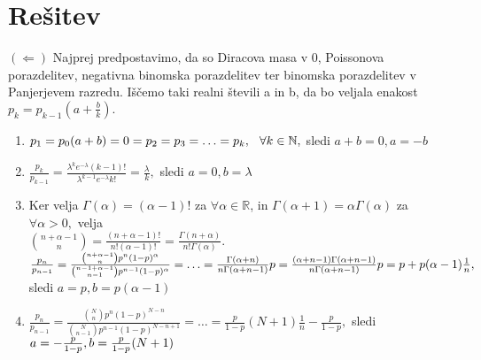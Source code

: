 \documentclass[a4paper]{article}
\begin{document}
\section{Rešitev}
$(\Leftarrow)$ Najprej predpostavimo, da so Diracova masa v 0, Poissonova porazdelitev, negativna binomska porazdelitev ter binomska porazdelitev v Panjerjevem razredu. Iščemo taki realni števili a in b, da bo veljala enakost $p_k = p_{k-1}(a + \frac{b}{k}).$
\begin{enumerate}
	\item{$p_1=p_0(a + b) = 0 = p_2 = p_3 = \ldots = p_k, \hspace{0.25cm} \forall k \in \mathbb{N},$ sledi $a + b = 0, a=-b$}
	\item{$\frac{p_k}{p_{k-1}}=\frac{\lambda^k e^{-\lambda}(k-1)!}{\lambda^{k-1} e^{-\lambda}k!} = \frac{\lambda}{k}, $ sledi $ a = 0, b = \lambda$} 
	\item{Ker velja $\Gamma(\alpha)=(\alpha-1)!$  za $\forall \alpha \in \mathbb{R}$, in $\Gamma(\alpha+1)=\alpha\Gamma(\alpha)$ za $\forall \alpha > 0,$ velja \\[1.5mm] ${n +\alpha - 1 \choose n} = \frac{(n+\alpha-1)!}{n!(\alpha-1)!}=\frac{\Gamma(n+\alpha)}{n!\Gamma(\alpha)}.$ \\[1.5mm] $\frac{p_n}{p_{n-1}}=\frac{\binom{n + \alpha - 1}{n}p^n(1-p)^{\alpha}}{\binom{n-1+\alpha-1}{n-1}p^{n-1}(1-p)^\alpha}=\ldots=\frac{\Gamma(\alpha+n)}{n\Gamma(\alpha+n-1)}p=\frac{(\alpha+n-1)\Gamma(\alpha+n-1)}{n\Gamma(\alpha+n-1)}p= \\[1.5mm] p+p(\alpha-1)\frac{1}{n}, $ sledi $ a=p, b=p(\alpha-1)$}
	\item{$\frac{p_n}{p_{n-1}}=\frac{\binom{N}{n}p^n(1-p)^{N-n}}{\binom{N}{n-1}p^{n-1}(1-p)^{N-n+1}}=\ldots=\frac{p}{1-p}(N+1)\frac{1}{n}-\frac{p}{1-p}, $ sledi $ a= \\[1.5mm] -\frac{p}{1-p}, b = \frac{p}{1-p}(N+1)$}
\end{enumerate}
\end{document}
